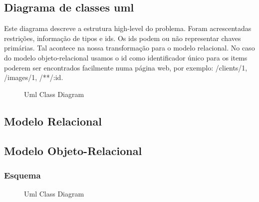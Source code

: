 \documentclass[a4paper,11pt]{article}
\begin{document}
\subsection{Diagrama de classes uml}
Este diagrama descreve a estrutura high-level do problema. Foram acrescentadas restrições, informação de tipos e ids. Os ids podem ou não representar chaves primárias. Tal acontece na nossa transformação para o modelo relacional. No caso do modelo objeto-relacional usamos o id como identificador único para os items poderem ser encontrados facilmente numa página web, por exemplo: /clients/1, /images/1, /**/:id. 

\begin{figure}[H]
	\centering
		\noindent{}
    \caption{Uml Class Diagram}
\end{figure}

\subsection{Modelo Relacional}


\subsection{Modelo Objeto-Relacional}
\subsubsection{Esquema}
\begin{figure}[H]
	\centering
    	\noindent{}
    \caption{Uml Class Diagram}
\end{figure}
\end{document}

